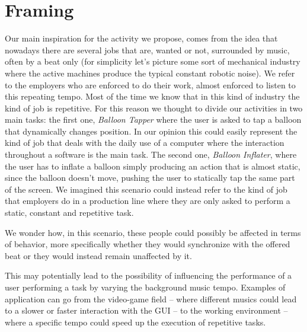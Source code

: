 
\section{Framing}

Our main inspiration for the activity we propose, comes from the idea that nowadays there are several jobs that are, wanted or not, surrounded by music, often by a beat only (for simplicity let's picture some sort of mechanical industry where the active machines produce the typical constant robotic noise). We refer to the employers who are enforced to do their work, almost enforced to listen to this repeating tempo. Most of the time we know that in this kind of industry the kind of job is repetitive. For this reason we thought to divide our activities in two main tasks: the first one, \textit{Balloon Tapper} where the user is asked to tap a balloon that dynamically changes position. In our opinion this could easily represent the kind of job that deals with the daily use of a computer where the interaction throughout a software is the main task. The second one, \textit{Balloon Inflater}, where the user has to inflate a balloon simply producing an action that is almost static, since the balloon doesn't move, pushing the user to statically tap the same part of the screen. We imagined this scenario could instead refer to the kind of job that employers do in a production line where they are only asked to perform a static, constant and repetitive task. 

We wonder how, in this scenario, these people could possibly be affected in terms of behavior, more specifically whether they would synchronize with the offered beat or they would instead remain unaffected by it.

This may potentially lead to the possibility of influencing the performance of a user performing a task by varying the background music tempo. Examples of application can go from the video-game field -- where different musics could lead to a slower or faster interaction with the GUI -- to the working environment -- where a specific tempo could speed up the execution of repetitive tasks.



